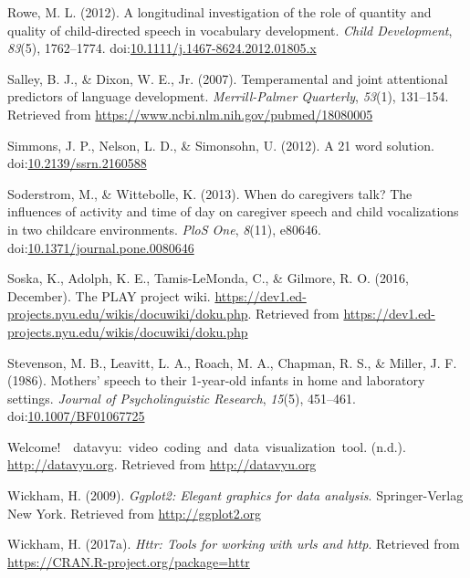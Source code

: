 \documentclass[english,man]{apa6}
\theoremstyle{definition}
\theoremstyle{definition}
\theoremstyle{definition}
\theoremstyle{remark}
\begin{document}
\hypertarget{ref-Rowe2012-vy}{}
Rowe, M. L. (2012). A longitudinal investigation of the role of quantity
and quality of child-directed speech in vocabulary development.
\emph{Child Development}, \emph{83}(5), 1762--1774.
doi:\href{https://doi.org/10.1111/j.1467-8624.2012.01805.x}{10.1111/j.1467-8624.2012.01805.x}

\hypertarget{ref-Salley2007-gz}{}
Salley, B. J., \& Dixon, W. E., Jr. (2007). Temperamental and joint
attentional predictors of language development. \emph{Merrill-Palmer
Quarterly}, \emph{53}(1), 131--154. Retrieved from
\url{https://www.ncbi.nlm.nih.gov/pubmed/18080005}

\hypertarget{ref-Simmons2012-ma}{}
Simmons, J. P., Nelson, L. D., \& Simonsohn, U. (2012). A 21 word
solution.
doi:\href{https://doi.org/10.2139/ssrn.2160588}{10.2139/ssrn.2160588}

\hypertarget{ref-Soderstrom2013-xn}{}
Soderstrom, M., \& Wittebolle, K. (2013). When do caregivers talk? The
influences of activity and time of day on caregiver speech and child
vocalizations in two childcare environments. \emph{PloS One},
\emph{8}(11), e80646.
doi:\href{https://doi.org/10.1371/journal.pone.0080646}{10.1371/journal.pone.0080646}

\hypertarget{ref-Soska2016-yo}{}
Soska, K., Adolph, K. E., Tamis-LeMonda, C., \& Gilmore, R. O. (2016,
December). The PLAY project wiki.
\url{https://dev1.ed-projects.nyu.edu/wikis/docuwiki/doku.php}.
Retrieved from
\url{https://dev1.ed-projects.nyu.edu/wikis/docuwiki/doku.php}

\hypertarget{ref-Stevenson1986-zh}{}
Stevenson, M. B., Leavitt, L. A., Roach, M. A., Chapman, R. S., \&
Miller, J. F. (1986). Mothers' speech to their 1-year-old infants in
home and laboratory settings. \emph{Journal of Psycholinguistic
Research}, \emph{15}(5), 451--461.
doi:\href{https://doi.org/10.1007/BF01067725}{10.1007/BF01067725}

\hypertarget{ref-datavyu-site}{}
Welcome!~\textbar{}\textbar{}~datavyu:~video~coding~and~data~visualization~tool.
(n.d.). \url{http://datavyu.org}. Retrieved from
\url{http://datavyu.org}

\hypertarget{ref-R-ggplot2}{}
Wickham, H. (2009). \emph{Ggplot2: Elegant graphics for data analysis}.
Springer-Verlag New York. Retrieved from \url{http://ggplot2.org}

\hypertarget{ref-R-httr}{}
Wickham, H. (2017a). \emph{Httr: Tools for working with urls and http}.
Retrieved from \url{https://CRAN.R-project.org/package=httr}
\end{document}
